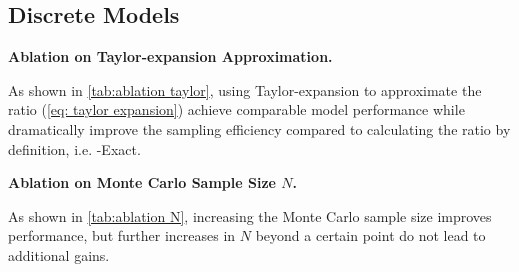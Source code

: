 \begin{table}[ht]
    \centering
    \caption{Ablation on $N_{\text{iter}}$ of \xcleansampling.}
    \label{tab:ablation N iter}
\end{table}








\subsection{Discrete Models}
\label{app:ablation discrete}

\textbf{Ablation on Taylor-expansion Approximation.}

As shown in \cref{tab:ablation taylor}, using Taylor-expansion to approximate the ratio (\cref{eq: taylor expansion}) achieve comparable model performance while dramatically improve the sampling efficiency compared to calculating the ratio by definition, i.e. \xtgrad-Exact.


\textbf{Ablation on Monte Carlo Sample Size $N$.}


As shown in \cref{tab:ablation N}, increasing the Monte Carlo sample size improves performance, but further increases in $N$ beyond a certain point do not lead to additional gains.





